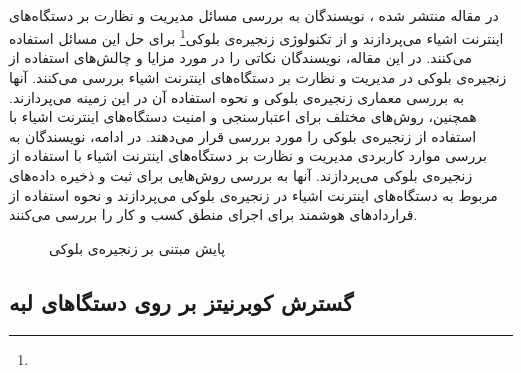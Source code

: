 \paragraph{}{
    در مقاله منتشر شده \cite{s19040856}،
    نویسندگان به بررسی مسائل مدیریت و نظارت بر دستگاه‌های اینترنت اشیاء می‌پردازند
    و از تکنولوژی زنجیره‌ی بلوکی\footnote{} برای حل این مسائل استفاده می‌کنند. 
    در این مقاله، نویسندگان نکاتی را در مورد مزایا و چالش‌های استفاده از زنجیره‌ی بلوکی در مدیریت 
    و نظارت بر دستگاه‌های اینترنت اشیاء بررسی می‌کنند. آنها به بررسی معماری زنجیره‌ی بلوکی و
    نحوه استفاده آن در این زمینه می‌پردازند. همچنین، روش‌های مختلف برای اعتبارسنجی و امنیت 
    دستگاه‌های اینترنت اشیاء با استفاده از زنجیره‌ی بلوکی را مورد بررسی قرار می‌دهند. در ادامه، 
    نویسندگان به بررسی موارد کاربردی مدیریت و نظارت بر دستگاه‌های اینترنت اشیاء با استفاده
    از زنجیره‌ی بلوکی می‌پردازند. آنها به بررسی روش‌هایی برای ثبت و ذخیره داده‌های مربوط به 
    دستگاه‌های اینترنت اشیاء در زنجیره‌ی بلوکی می‌پردازند و نحوه استفاده از قراردادهای هوشمند
    برای اجرای منطق کسب و کار را بررسی می‌کنند.
    \begin{figure}[H]
        \caption{پایش مبتنی بر زنجیره‌ی بلوکی \cite{s19040856}}
        \label{fig:blockchain_monitoring}
    \end{figure}
}

\subsection{
    گسترش کوبرنیتز بر روی دستگا‌های لبه
}
\label{subsec:extending_kubernetes_to_edge}
